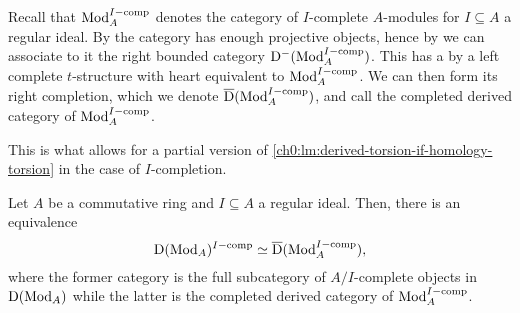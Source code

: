 \begin{construction}
    \label{ch0:const:completed-derived-category}
    Recall that $\mathrm{Mod}_A^{I-\mathrm{comp}}$ denotes the category of $I$-complete $A$-modules for $I\subseteq A$ a regular ideal. By \cite[2.11]{barthel-heard-valenzuela_2020} the category has enough projective objects, hence by \cite[1.3.2]{Lurie_HA} we can associate to it the right bounded category $\mathrm{D}^-(\mathrm{Mod}_A^{I-\mathrm{comp}})$. This has a by \cite[1.3.2.19, 1.3.3.16]{Lurie_HA} a left complete $t$-structure with heart equivalent to $\mathrm{Mod}_A^{I-\mathrm{comp}}$. We can then form its right completion, which we denote $\overline{\mathrm{D}}(\mathrm{Mod}_A^{I-\mathrm{comp}})$, and call the completed derived category of $\mathrm{Mod}_A^{I-\mathrm{comp}}$. 
\end{construction}

This is what allows for a partial version of \cref{ch0:lm:derived-torsion-if-homology-torsion} in the case of $I$-completion. 

\begin{proposition}
    \label{ch0:prop:pulling-out-completion}
    Let $A$ be a commutative ring and $I\subseteq A$ a regular ideal. Then, there is an equivalence 
    \[\mathrm{D}(\mathrm{Mod}_A)^{I-\mathrm{comp}}\simeq \overline{\mathrm{D}}(\mathrm{Mod}_A^{I-\mathrm{comp}}),\]
    where the former category is the full subcategory of $A/I$-complete objects in $\mathrm{D}(\mathrm{Mod}_A)$ while the latter is the completed derived category of $\mathrm{Mod}_A^{I-\mathrm{comp}}$. 
\end{proposition}











